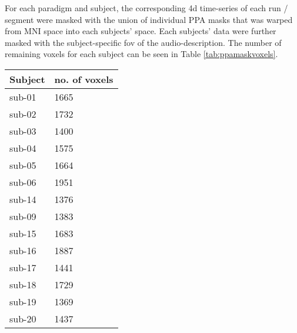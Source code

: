 







For each paradigm and subject, the corresponding 4d time-series of each run /
segment were masked with the union of individual PPA masks
\citep[s.][]{haeusler2022processing} that was warped from MNI space into each
subjects' space.
Each subjects' data were further masked with the subject-specific \ac{fov} of
the audio-description.
%
The number of remaining voxels for each subject can be seen in Table
\ref{tab:ppamaskvoxels}.


\begin{table*}[btp]
    \caption{Number of remaining voxels after each subject's brain was masked
    with the union of individual \acp{ppa} that was warped from MNI space into
    each individual's subjects-space and a subject's-specific FoV from AO study.}

\label{tab:ppamaskvoxels}
\begin{tabular}{ll}
\toprule
\textbf{Subject} & \textbf{no. of voxels} \\
\midrule
sub-01 & 1665 \tabularnewline
sub-02 & 1732 \tabularnewline
sub-03 & 1400 \tabularnewline
sub-04 & 1575 \tabularnewline
sub-05 & 1664 \tabularnewline
sub-06 & 1951 \tabularnewline
sub-14 & 1376 \tabularnewline
sub-09 & 1383 \tabularnewline
sub-15 & 1683 \tabularnewline
sub-16 & 1887 \tabularnewline
sub-17 & 1441 \tabularnewline
sub-18 & 1729 \tabularnewline
sub-19 & 1369 \tabularnewline
sub-20 & 1437 \tabularnewline
\bottomrule
\end{tabular}
\end{table*}

